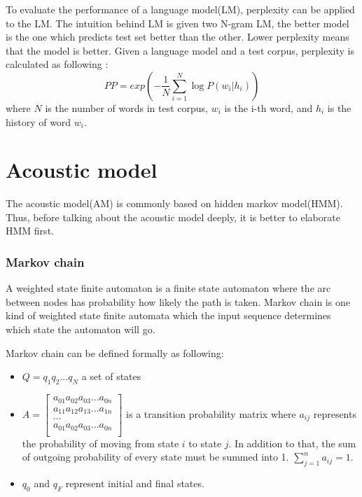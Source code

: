 To evaluate the performance of a language model(LM), perplexity can be applied to the LM. The intuition behind LM is given two N-gram LM, the better model is the one which predicts test set better than the other. Lower perplexity means that the model is better. Given a language model and a test corpus, perplexity is calculated as following \cite{Bahl:1983:MLA:2053027.2053281} \cite{Klakow:2002:TCW:638078.638080}:
\begin{equation}
PP = exp(-\frac{1}{N} \sum^{N}_{i=1} \log P(w_{i}|h_{i}))
\end{equation}
where $N$ is the number of words in test corpus, $w_{i}$ is the i-th word, and $h_{i}$ is the history of word $w_{i}$.


\section{Acoustic model}
The acoustic model(AM) is commonly based on hidden markov model(HMM). Thus, before talking about the acoustic model deeply, it is better to elaborate HMM first. 


\subsubsection{Markov chain}
A weighted state finite automaton is a finite state automaton where the arc between nodes has probability how likely the path is taken. Markov chain is one kind of weighted state finite automata which the input sequence determines which state the automaton will go.

Markov chain can be defined formally as following:
\begin{itemize}
\item $Q=q_{1}q_{2}...q_{N}$ a set of states
\item  $A=
\begin{bmatrix}
a_{01}a_{02}a_{03}...a_{0n} \\
a_{11}a_{12}a_{13}...a_{1n} \\
... \\
a_{01}a_{02}a_{03}...a_{0n} \\
\end{bmatrix}
$ is a transition probability matrix where $a_{ij}$ represents the probability of moving from state $i$ to state $j$. In addition to that, the sum of outgoing probability of every state must be summed into 1. $\sum_{j=1}^{n}  a_{ij}=1$. 
\item $q_{0}$ and $q_{F}$ represent initial and final states.
\end{itemize}

